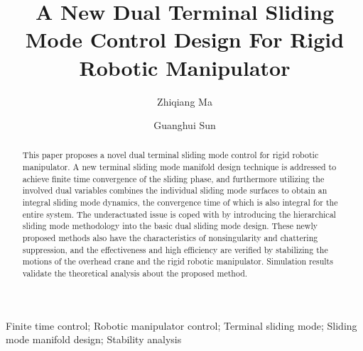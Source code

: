 \documentclass[3p]{elsarticle}
\theoremstyle{plain}
\theoremstyle{remark}
\begin{document}
\begin{frontmatter}
\title{A New Dual Terminal Sliding Mode Control Design For Rigid Robotic Manipulator}
\author{Zhiqiang Ma}
\author{Guanghui Sun}
\address{Research Institute of Intelligent Control and Systems, Harbin Institute of Technology, Harbin 150001, China}

\begin{abstract}
This paper proposes a novel dual terminal sliding mode control for rigid robotic manipulator. A new terminal sliding mode manifold design technique is addressed to achieve finite time convergence of the sliding phase, and furthermore utilizing the involved dual variables combines the individual sliding mode surfaces to obtain an integral sliding mode dynamics, the convergence time of which is also integral for the entire system. The underactuated issue is coped with by introducing the hierarchical sliding mode methodology into the basic dual sliding mode design. These newly proposed methods also have the characteristics of nonsingularity and chattering suppression, and the effectiveness and high efficiency are verified by stabilizing the motions of the overhead crane and the rigid robotic manipulator. Simulation results validate the theoretical analysis about the proposed method.
\end{abstract}
\begin{keyword}
Finite time control; Robotic manipulator control; Terminal sliding mode; Sliding mode manifold design; Stability analysis
\end{keyword}
\end{frontmatter}
\end{document}
